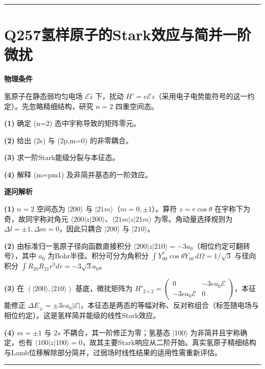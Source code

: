 \documentclass[UTF8,a4paper,11pt,oneside,openany]{ctexbook}
\begin{document}
\par\bigskip\hrule\bigskip
\section*{Q257\quad 氢样原子的Stark效应与简并一阶微扰}
\textbf{物理条件}\par 氢原子在静态弱均匀电场 \(\mathcal E\hat z\) 下，扰动 \(H' = e\mathcal E z\)（采用电子电势能符号的这一约定）。先忽略精细结构，研究 \(n=2\) 四重空间态。
\par\noindent\textbf{(1)} 确定 (n=2) 态中宇称导致的矩阵零元。
\par\noindent\textbf{(2)} 给出 (2s) 与 (2p,m=0) 的非零耦合。
\par\noindent\textbf{(3)} 求一阶Stark能级分裂与本征态。
\par\noindent\textbf{(4)} 解释 (m=pm1) 及非简并基态的一阶效应。

\par\medskip\noindent\textbf{逐问解析}
\par\noindent\textbf{(1)} \(n=2\) 空间态为 \(|200\rangle\) 与 \(|21m\rangle\)（\(m=0,\pm1\)）。算符 \(z=r\cos\theta\) 在宇称下为奇，故同宇称对角元 \(\langle 200|z|200\rangle\)、\(\langle21m|z|21m\rangle\) 为零。角动量选择规则为 \(\Delta l=\pm1,\Delta m=0\)，因此只耦合 \(|200\rangle\) 与 \(|210\rangle\)。
\par\noindent\textbf{(2)} 由标准归一氢原子径向函数直接积分 \( \langle 200|z|210\rangle=-3a_0\)（相位约定可翻转号），其中 \(a_0\) 为Bohr半径。积分可分为角积分 \(\int Y_{00}^*\cos\theta Y_{10}\,d\Omega=1/\sqrt3\) 与径向积分 \(\int R_{20}R_{21}r^3dr=-3\sqrt3a_0\)。
\par\noindent\textbf{(3)} 在 \((|200\rangle,|210\rangle)\) 基底，微扰矩阵为 \(H'_{2\times2}=\begin{pmatrix}0&-3ea_0\mathcal E\\-3ea_0\mathcal E&0\end{pmatrix}\)，本征能修正 \(\Delta E_\pm=\pm3ea_0|\mathcal E|\)，本征态是两态的等幅对称、反对称组合（标签随电场与相位约定）。这是氢样简并能级的线性Stark效应。
\par\noindent\textbf{(4)} \(m=\pm1\) 与 \(2s\) 不耦合，其一阶修正为零；氢基态 \(|100\rangle\) 为非简并且宇称确定，也有 \(\langle100|z|100\rangle=0\)，故其主要Stark响应从二阶开始。真实氢原子精细结构与Lamb位移解除部分简并，过弱场时线性结果的适用性需重新评估。

\par\bigskip\hrule\bigskip
\end{document}
